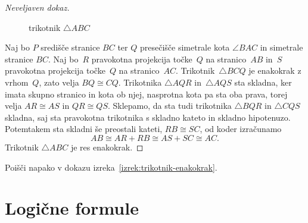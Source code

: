 \begin{proof}[Neveljaven dokaz]
\begin{figure}[ht]
\begin{center}
\end{center}
    \caption{trikotnik $\triangle ABC$}
    \label{fig:trikotnik}
  \end{figure}
  Naj bo $P$ središče stranice $BC$ ter $Q$ presečišče simetrale kota $\angle BAC$ in simetrale stranice $BC$.
  Naj bo~$R$ pravokotna projekcija točke~$Q$ na stranico~$AB$ in~$S$ pravokotna projekcija točke~$Q$ na stranico~$AC$.
  Trikotnik~$\triangle BCQ$ je enakokrak z vrhom~$Q$, zato velja $BQ \cong CQ$.
  Trikotnika $\triangle AQR$ in~$\triangle AQS$ sta skladna, ker imata skupno stranico in kota ob njej, nasprotna kota pa sta oba prava, torej velja $AR \cong AS$ in $QR \cong QS$.
  Sklepamo, da sta tudi trikotnika $\triangle BQR$ in $\triangle CQS$ skladna, saj sta pravokotna trikotnika s skladno kateto in skladno hipotenuzo. Potemtakem sta skladni še preostali kateti, $RB \cong SC$, od koder izračunamo
  \begin{equation*}
    AB \cong AR + RB \cong AS + SC \cong AC.
  \end{equation*}
  Trikotnik $\triangle ABC$ je res enakokrak.
\end{proof}

\begin{vaja}
  Poišči napako v dokazu izreka~\ref{izrek:trikotnik-enakokrak}.
\end{vaja}


\section{Logične formule}
\label{sec:simbolni-zapis-izjav}

